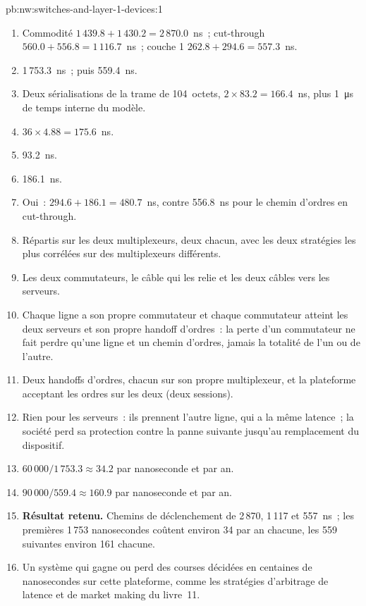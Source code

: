 \begin{solution}{pb:nw:switches-and-layer-1-devices:1}
\begin{enumerate}
\item Commodité $1\,439.8 + 1\,430.2 = 2\,870.0$~ns~; cut-through $560.0 + 556.8 = 1\,116.7$~ns~; couche 1 $262.8 + 294.6 = 557.3$~ns.
\item 1\,753.3~ns~; puis 559.4~ns.
\item Deux sérialisations de la trame de 104~octets, $2 \times 83.2 = 166.4$~ns, plus \qty{1}{\micro\second} de temps interne du modèle.
\item $36 \times 4.88 = 175.6$~ns.
\item 93.2~ns.
\item 186.1~ns.
\item Oui~: $294.6 + 186.1 = 480.7$~ns, contre 556.8~ns pour le chemin d'ordres en cut-through.
\item Répartis sur les deux multiplexeurs, deux chacun, avec les deux stratégies les plus corrélées sur des multiplexeurs différents.
\item Les deux commutateurs, le câble qui les relie et les deux câbles vers les serveurs.
\item Chaque ligne a son propre commutateur et chaque commutateur atteint les deux serveurs et son propre handoff d'ordres~: la perte d'un commutateur ne fait perdre qu'une ligne
  et un chemin d'ordres, jamais la totalité de l'un ou de l'autre.
\item Deux handoffs d'ordres, chacun sur son propre multiplexeur, et la plateforme acceptant les ordres sur les deux (deux sessions).
\item Rien pour les serveurs~: ils prennent l'autre ligne, qui a la même latence~; la société perd sa protection contre la panne suivante jusqu'au remplacement du dispositif.
  \\
\item $60\,000 / 1\,753.3 \approx 34.2$ par nanoseconde et par an.
\item $90\,000 / 559.4 \approx 160.9$ par nanoseconde et par an.
\item \textbf{Résultat retenu.} Chemins de déclenchement de 2\,870, 1\,117 et 557~ns~; les premières 1\,753 nanosecondes coûtent environ 34 par an chacune, les
  559 suivantes environ 161 chacune.
\item Un système qui gagne ou perd des courses décidées en centaines de nanosecondes sur cette plateforme, comme les stratégies d'arbitrage de latence et de market making
  du livre~11.

\end{enumerate}
\end{solution}
